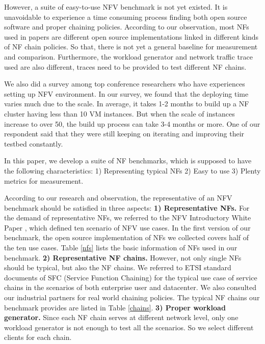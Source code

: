 \documentclass{sig-alternate-10pt}
\begin{document}

However, a suite of easy-to-use NFV benchmark is not yet existed. It is unavoidable to experience a time consuming process finding both open source software and proper chaining policies. According to our observation, most NFs used in papers are different open source implementations linked in different kinds of NF chain policies. So that, there is not yet a general baseline for measurement and comparison. Furthermore, the workload generator and network traffic trace used are also different, traces need to be provided to test different NF chains.

We also did a survey among top conference researchers who have experiences setting up NFV environment. In our survey, we found that the deploying time varies much due to the scale. In average, it takes 1-2 months to build up a NF cluster having less than 10 VM instances. But when the scale of instances increase to over 50, the build up process can take 3-4 months or more. One of our respondent said that they were still keeping on iterating and improving their testbed constantly.



In this paper, we develop a suite of NF benchmarks, which is supposed to have the following characteristics: 1) Representing typical NFs 2) Easy to use 3) Plenty metrics for measurement.

According to our research and observation,
the representative of an NFV benchmark
should be satisfied in three aspects:
\textbf{1) Representative NFs.}
For the demand of representative NFs,
we referred to the NFV Introductory White Paper \cite{},
which defined ten scenario of NFV use cases.
In the first version of our benchmark,
the open source implementation of NFs we collected
covers half of the ten use cases.
Table \ref{nfs} lists the basic information of NFs used in our benchmark.
\textbf{2) Representative NF chains.}
However, not only single NFs should be typical, but also the NF chains.
We referred to ETSI standard documents of SFC
(Service Function Chaining) \cite{draft-ietf-sfc-dc-use-cases-06}
for the typical use case of service chains
in the scenarios of both enterprise user and datacenter.
We also consulted our industrial partners for real world chaining policies.
The typical NF chains our benchmark provides are listed in Table \ref{chains}.
\textbf{3) Proper workload generator.}
Since each NF chain serves at different network level,
only one workload generator is not enough to test all the scenarios.
So we select different clients for each chain.
\end{document}
